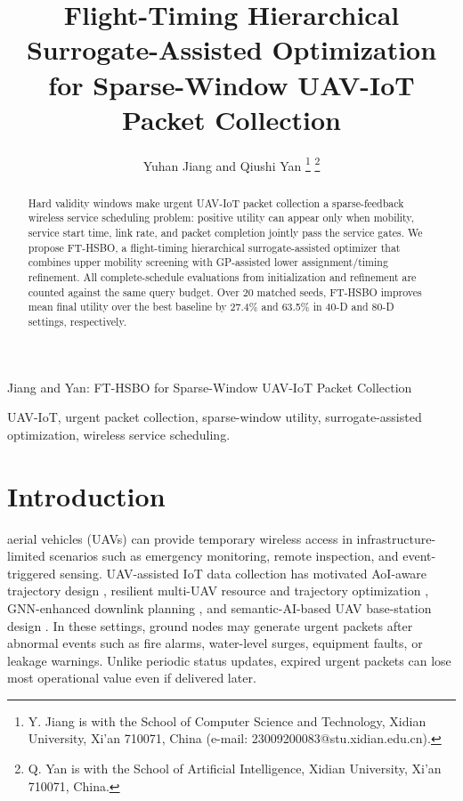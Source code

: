 \documentclass[letterpaper,journal]{IEEEtran}
\begin{document}
\title{Flight-Timing Hierarchical Surrogate-Assisted Optimization for Sparse-Window UAV-IoT Packet Collection}

\author{Yuhan Jiang and Qiushi Yan%
\thanks{Y. Jiang is with the School of Computer Science and Technology, Xidian University, Xi'an 710071, China (e-mail: 23009200083@stu.xidian.edu.cn).}
\thanks{Q. Yan is with the School of Artificial Intelligence, Xidian University, Xi'an 710071, China.}}

%
{Jiang and Yan: FT-HSBO for Sparse-Window UAV-IoT Packet Collection}

\maketitle

\begin{abstract}
Hard validity windows make urgent UAV-IoT packet collection a sparse-feedback wireless service scheduling problem: positive utility can appear only when mobility, service start time, link rate, and packet completion jointly pass the service gates. We propose FT-HSBO, a flight-timing hierarchical surrogate-assisted optimizer that combines upper mobility screening with GP-assisted lower assignment/timing refinement. All complete-schedule evaluations from initialization and refinement are counted against the same query budget. Over 20 matched seeds, FT-HSBO improves mean final utility over the best baseline by 27.4\% and 63.5\% in 40-D and 80-D settings, respectively.
\end{abstract}

\begin{IEEEkeywords}
UAV-IoT, urgent packet collection, sparse-window utility, surrogate-assisted optimization, wireless service scheduling.
\end{IEEEkeywords}

\section{Introduction}
 aerial vehicles (UAVs) can provide temporary wireless access in infrastructure-limited scenarios such as emergency monitoring, remote inspection, and event-triggered sensing. UAV-assisted IoT data collection has motivated AoI-aware trajectory design \cite{sun2024}, resilient multi-UAV resource and trajectory optimization \cite{ge2024}, GNN-enhanced downlink planning \cite{zhong2024}, and semantic-AI-based UAV base-station design \cite{yuan2025}. In these settings, ground nodes may generate urgent packets after abnormal events such as fire alarms, water-level surges, equipment faults, or leakage warnings. Unlike periodic status updates, expired urgent packets can lose most operational value even if delivered later.
\end{document}
